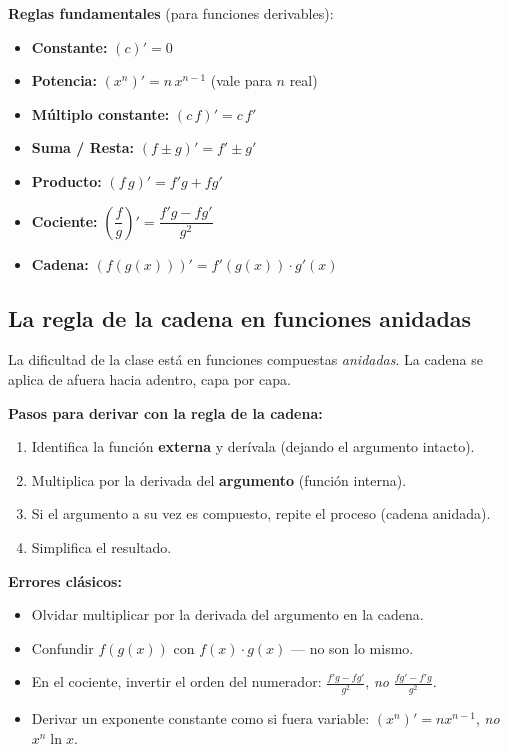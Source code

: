 \documentclass[12pt, letterpaper]{article}
\begin{document}
\begin{cuadroteoria}
  \textbf{Reglas fundamentales} (para funciones derivables):
  \begin{itemize}
    \item \textbf{Constante:} $(c)' = 0$
    \item \textbf{Potencia:} $(x^n)' = n\,x^{n-1}$ \qquad (vale para $n$ real)
    \item \textbf{Múltiplo constante:} $(c\,f)' = c\,f'$
    \item \textbf{Suma / Resta:} $(f \pm g)' = f' \pm g'$
    \item \textbf{Producto:} $(f\,g)' = f'g + fg'$
    \item \textbf{Cociente:} $\left(\dfrac{f}{g}\right)' = \dfrac{f'g - fg'}{g^2}$
    \item \textbf{Cadena:} $(f(g(x)))' = f'(g(x))\cdot g'(x)$
  \end{itemize}
\end{cuadroteoria}

\subsection{La regla de la cadena en funciones anidadas}

La dificultad de la clase está en funciones compuestas \emph{anidadas}. La cadena se aplica de afuera hacia adentro, capa por capa.

\begin{cuadropasos}
  \textbf{Pasos para derivar con la regla de la cadena:}
  \begin{enumerate}
    \item Identifica la función \textbf{externa} y derívala (dejando el argumento intacto).
    \item Multiplica por la derivada del \textbf{argumento} (función interna).
    \item Si el argumento a su vez es compuesto, repite el proceso (cadena anidada).
    \item Simplifica el resultado.
  \end{enumerate}
\end{cuadropasos}

\begin{cuadroadvertencia}
  \textbf{Errores clásicos:}
  \begin{itemize}
    \item Olvidar multiplicar por la derivada del argumento en la cadena.
    \item Confundir $f(g(x))$ con $f(x)\cdot g(x)$ — no son lo mismo.
    \item En el cociente, invertir el orden del numerador: $\frac{f'g - fg'}{g^2}$, \emph{no} $\frac{fg' - f'g}{g^2}$.
    \item Derivar un exponente constante como si fuera variable: $(x^n)' = n x^{n-1}$, \emph{no} $x^n \ln x$.
  \end{itemize}
\end{cuadroadvertencia}
\end{document}
